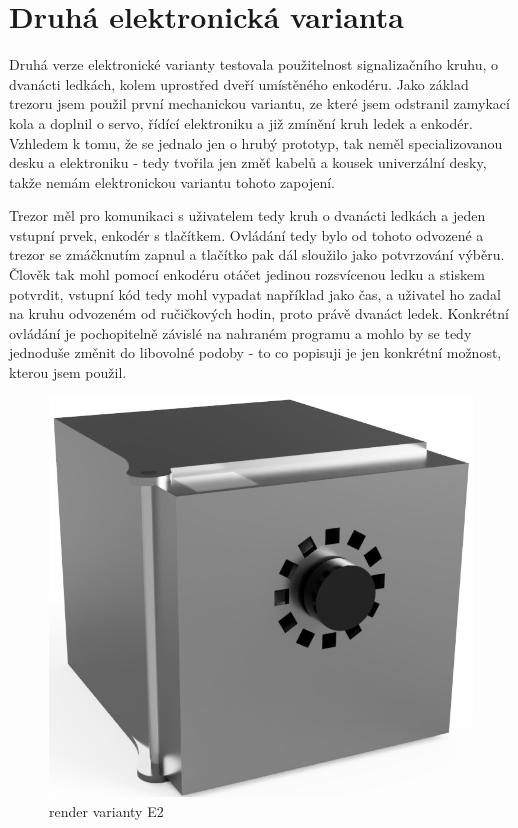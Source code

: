 \section{Druhá elektronická varianta}


Druhá verze elektronické varianty testovala použitelnost signalizačního kruhu, o dvanácti ledkách, kolem uprostřed dveří
umístěného enkodéru. Jako základ trezoru jsem použil první mechanickou variantu, ze které jsem odstranil zamykací kola 
a doplnil o servo, řídící elektroniku a již zmínění kruh ledek a enkodér.
Vzhledem k tomu, že se jednalo jen o hrubý prototyp, tak neměl specializovanou desku a elektroniku - tedy tvořila jen změť kabelů 
a kousek univerzální desky, takže nemám elektronickou variantu tohoto zapojení. %

Trezor měl pro komunikaci s uživatelem tedy kruh o dvanácti ledkách a jeden vstupní prvek, enkodér s tlačítkem.
Ovládání tedy bylo od tohoto odvozené a trezor se zmáčknutím zapnul a tlačítko pak dál sloužilo jako potvrzování výběru.
Člověk tak mohl pomocí enkodéru otáčet jedinou rozsvícenou ledku a stiskem potvrdit, vstupní kód tedy mohl vypadat 
například jako čas, a uživatel ho zadal na kruhu odvozeném od ručičkových hodin, proto právě dvanáct ledek.
Konkrétní ovládání je pochopitelně závislé na nahraném programu a mohlo by se tedy jednoduše změnit do libovolné podoby -
to co popisuji je jen konkrétní možnost, kterou jsem použil.

\begin{figure}[htbp]
    \centering
    \includegraphics[width=\textwidth]{kapitoly/obrazky/E2/predni_render.png}
    \caption{render varianty E2}
    \label{fig:E2-render}
\end{figure}

\newpage